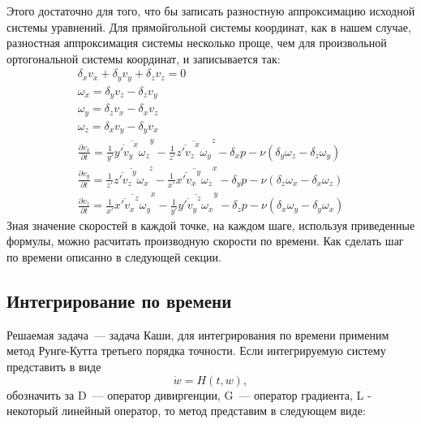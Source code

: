 Этого достаточно для того, что бы записать разностную аппроксимацию исходной системы уравнений. Для прямойгольной системы координат, как в нашем случае, разностная аппроксимация системы несколько проще, чем для произвольной ортогональной системы координат, и записывается так:
\begin{gather}
  \delta_x v_x + \delta_y v_y + \delta_z v_z = 0 
  \\
  \omega_x = \delta_y v_z - \delta_z v_y 
  \\
  \omega_y = \delta_z v_x - \delta_x v_z 
  \\
  \omega_z = \delta_x v_y - \delta_y v_x 
  \\
  \frac{\partial v_x}{\partial t} = \frac{1}{y'}\overline{\overline{y'v_y}^x \omega_z}^y - \frac{1}{z'}\overline{\overline{z'v_z}^x \omega_y}^z - \delta_x p - \nu (\delta_y \omega_z - \delta_z \omega_y)
  \\
  \frac{\partial v_y}{\partial t} = \frac{1}{z'}\overline{\overline{z'v_z}^y \omega_x}^z - \frac{1}{x'}\overline{\overline{x'v_x}^y \omega_z}^x - \delta_y p - \nu (\delta_z \omega_x - \delta_x \omega_z) 
  \\
  \frac{\partial v_z}{\partial t} = \frac{1}{x'}\overline{\overline{x'v_x}^z \omega_y}^x - \frac{1}{y'}\overline{\overline{y'v_y}^z \omega_x}^y - \delta_z p - \nu (\delta_x \omega_y - \delta_y \omega_x)
\end{gather}
Зная значение скоростей в каждой точке, на каждом шаге, используя приведенные формулы, можно расчитать производную скорости по времени. Как сделать шаг по времени описанно в следующей секции. 

\subsection*{Интегрирование по времени}

Решаемая задача~--- задача Каши, для интегрирования по времени применим метод Рунге-Кутта третьего порядка точности.
Если интегрируемую систему представить в виде 
$$
	\dot w = H(t,w),
$$
обозначить за D~--- оператор дивиргенции, G~--- оператор градиента, L - некоторый линейный оператор, то метод представим в следующем виде:

